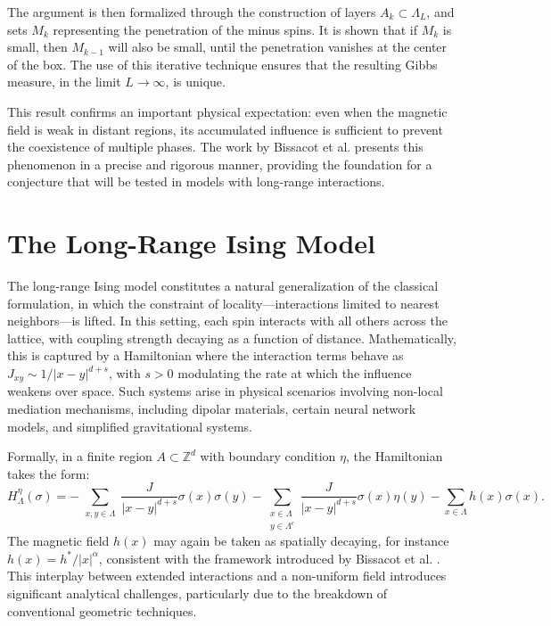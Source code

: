 \documentclass{article}
\begin{document}
The argument is then formalized through the construction of layers $A_k \subset \Lambda_L$, and sets $M_k$ representing the penetration of the minus spins. It is shown that if $M_k$ is small, then $M_{k-1}$ will also be small, until the penetration vanishes at the center of the box. The use of this iterative technique ensures that the resulting Gibbs measure, in the limit $L \to \infty$, is unique.

This result confirms an important physical expectation: even when the magnetic field is weak in distant regions, its accumulated influence is sufficient to prevent the coexistence of multiple phases. The work by Bissacot et al. \cite{bissacot2015} presents this phenomenon in a precise and rigorous manner, providing the foundation for a conjecture that will be tested in models with long-range interactions.

\section{The Long-Range Ising Model}
\hypertarget{pag4}{}

The long-range Ising model constitutes a natural generalization of the classical formulation, in which the constraint of locality---interactions limited to nearest neighbors---is lifted. In this setting, each spin interacts with all others across the lattice, with coupling strength decaying as a function of distance. Mathematically, this is captured by a Hamiltonian where the interaction terms behave as $J_{xy} \sim 1/|x-y|^{d+s}$, with $s>0$ modulating the rate at which the influence weakens over space. Such systems arise in physical scenarios involving non-local mediation mechanisms, including dipolar materials, certain neural network models, and simplified gravitational systems.

Formally, in a finite region $A\subset\mathbb{Z}^d$ with boundary condition $\eta$, the Hamiltonian takes the form:
\[
H_\Lambda^\eta(\sigma) = -\sum_{\substack{x,y\in\Lambda}} \frac{J}{|x-y|^{d+s}} \sigma(x)\sigma(y) 
- \sum_{\substack{x\in\Lambda\\ y\in\Lambda^c}} \frac{J}{|x-y|^{d+s}} \sigma(x)\eta(y) 
- \sum_{x\in\Lambda} h(x)\sigma(x).
\]
The magnetic field $h(x)$ may again be taken as spatially decaying, for instance $h(x) = h^*/|x|^\alpha$, consistent with the framework introduced by Bissacot et al. \cite{bissacot2015}. This interplay between extended interactions and a non-uniform field introduces significant analytical challenges, particularly due to the breakdown of conventional geometric techniques.
\end{document}
